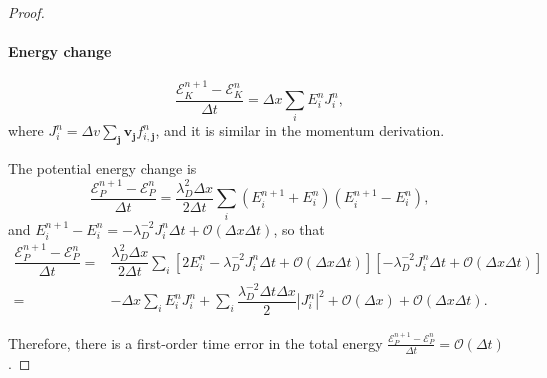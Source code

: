 \documentclass[preprint,1p,times]{elsarticle}
\newcommand{\cO}{\mathcal{O}}
\theoremstyle{definition}
\theoremstyle{remark}
\begin{document}
\begin{proof}
\paragraph{Energy change}

\begin{equation}
    \dfrac{\mathcal E_K^{n+1}-\mathcal E_K^n}{\Delta t} = \Delta x \sum_{i} E_{i}^{n} J_{i}^{n},
\end{equation}
where $J_{i}^{n} = \Delta v \sum_{\bm{j}} \bm{v}_{\bm{j}} f_{i,\bm{j}}^{n}$, and it is similar in the momentum derivation.

The potential energy change is 
\begin{equation}
    \dfrac{\mathcal{E}_{P}^{n+1}-\mathcal{E}_{P}^n}{\Delta t} = \dfrac{\lambda_{D}^{2} \Delta x}{2 \Delta t} \sum_{i} (E_{i}^{n+1} + E_{i}^{n}) (E_{i}^{n+1} - E_{i}^{n}) ,
\end{equation}
and $E_{i}^{n+1} - E_{i}^{n} = - \lambda_{D}^{-2} J_{i}^{n} \Delta t + \cO(\Delta x \Delta t)$,
so that 
\begin{equation}
\begin{aligned}
    \dfrac{\mathcal{E}_{P}^{n+1}-\mathcal{E}_{P}^{n}}{\Delta t} =& \dfrac{\lambda_{D}^{2} \Delta x}{2 \Delta t} \sum_{i} [2E_{i}^{n} - \lambda_{D}^{-2} J_{i}^{n} \Delta t + \cO(\Delta x \Delta t)] [- \lambda_{D}^{-2} J_{i}^{n} \Delta t + \cO(\Delta x \Delta t)] \\
    =& - \Delta x \sum_{i} E_{i}^{n} J_{i}^{n} + \sum_{i} \dfrac{\lambda_{D}^{-2} \Delta t \Delta x}{2} |J_{i}^{n}|^{2} + \cO(\Delta x) + \cO(\Delta x \Delta t) .
\end{aligned}
\end{equation}

Therefore, there is a first-order time error in the total energy $\frac{\mathcal{E}_{P}^{n+1}-\mathcal{E}_{P}^{n}}{\Delta t} = \cO(\Delta t)$.




\end{proof}
\end{document}
